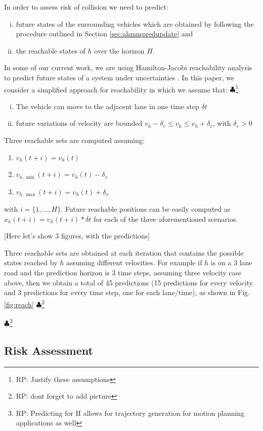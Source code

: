 \documentclass[letterpaper, 10 pt, conference]{ieeeconf}  %
\newcommand\RP[1]{$\clubsuit$\footnote{RP: #1}}
\begin{document}
In order to assess risk of collision we need to predict:
\begin{enumerate}[i.]
\item future states of the surrounding vehicles which are obtained by following the procedure outlined in Section \ref{sec:ahmmpredupdate} and
\item the reachable states of $h$ over the horizon $H$.
\end{enumerate}
In some of our current work, we are using Hamilton-Jacobi reachability analysis to predict future states of a system under uncertainties \cite{esen}. In this paper, we consider a simplified approach for reachability in which we assume that: \RP{Justify these assumptions}
\begin{enumerate}[i.]
\item The vehicle can move to the adjacent lane in one time step $\delta t$
\item future variations of velocity are bounded $v_h-\delta_v \leq v_h\leq v_h+\delta_v$, with $\delta_v>0$
\end{enumerate}
Three reachable sets are computed assuming:
\begin{enumerate}
    \item $v_h(t+i)=v_h(t)$
    \item $v_{h,\min}(t+i)=v_h(t)-\delta_v$
    \item $v_{h,\max}(t+i)=v_h(t)+\delta_v$
\end{enumerate} with $i=\{1,...,H\}$. Future reachable positions can be easily computed as $x_h(t+i)=v_h(t+i)*\delta t$ for each of the three aforementioned scenarios.  

[Here let's show 3 figures, with the predictions]

Three reachable sets are obtained at each iteration that contains the possible states reached by $h$ assuming different velocities. For example if $h$ is on a 3 lane road and the prediction horizon is 3 time steps, assuming three velocity case above, then we obtain a total of 45 predictions (15 predictions for every velocity and 3 predictions for every time step, one for each lane/time), as shown in Fig. \ref{fig:reach} \RP{dont forget to add picture}

\RP{Predicting for H allows for trajectory generation for motion planning applications as well}

\subsection{Risk Assessment}
\end{document}
